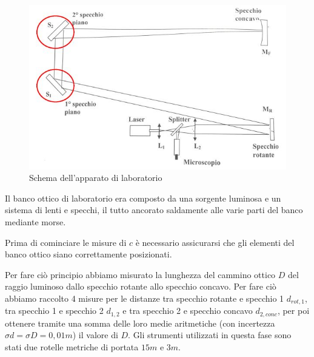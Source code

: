 \documentclass{article}
\begin{document}
\begin{figure}[h] %
    \centering
    \includegraphics[width=0.6\linewidth]{Progettazione1.JPG}
    \caption{Schema dell'apparato di laboratorio}
    \label{schema_apparato}
\end{figure}

Il banco ottico di laboratorio era composto da una sorgente luminosa e un sistema di lenti e specchi, il tutto ancorato saldamente alle varie parti del banco mediante 
morse.

Prima di cominciare le misure di $c$ è necessario assicurarsi che gli elementi del banco ottico siano correttamente posizionati.

\vspace{3mm}

Per fare ciò principio abbiamo misurato la lunghezza del cammino ottico $D$ del raggio luminoso dallo specchio rotante allo specchio concavo. Per fare ciò abbiamo raccolto 
4 misure per le distanze tra specchio rotante e specchio 1 $d_{rot,1}$, tra specchio 1 e specchio 2 $d_{1,2}$ e tra specchio 2 e specchio concavo $d_{2,conc}$, per poi 
ottenere tramite una somma delle loro medie aritmetiche (con incertezza $\sigma d = \sigma D = 0,01 m$) il valore di $D$. Gli strumenti utilizzati in questa fase sono
stati due rotelle metriche di portata $15m$ e $3m$.
\end{document}
